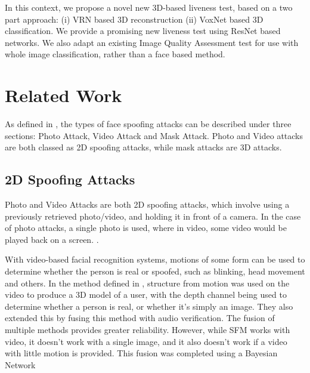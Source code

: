 \documentclass[11pt,a4paper]{article}
\begin{document}
    In this context, we propose a novel new 3D-based liveness test, based on a two part approach: (i) VRN based 3D reconstruction (ii) VoxNet based 3D classification.
    We provide a promising new liveness test using ResNet based networks. We also adapt an existing Image Quality Assessment test for use with whole image classification, rather
    than a face based method.

\section{Related Work}
    As defined in \cite{FaceSpoofingAttacksStudy}, the types of face spoofing attacks can be described under three sections: Photo Attack, Video Attack and Mask Attack.
    Photo and Video attacks are both classed as 2D spoofing attacks, while mask attacks are 3D attacks.

    \subsection{2D Spoofing Attacks}
        Photo and Video Attacks are both 2D spoofing attacks, which involve using a previously retrieved photo/video, and holding it in front of a camera. In the case of photo attacks,
        a single photo is used, where in video, some video would be played back on a screen. \cite{FaceSpoofingAttacksStudy}.

        With video-based facial recognition systems, motions of some form can be used to determine whether the person is real or spoofed, such as blinking, head movement and others.
        In the method defined in \cite{SFMClassifier}, structure from motion was used on the video to produce a 3D model of a user, with the depth channel being used to determine whether a person is real, or whether it's simply an image.
        They also extended this by fusing this method with audio verification. The fusion of multiple methods provides greater reliability. However, while SFM works with video, it doesn't work with a single image,
        and it also doesn't work if a video with little motion is provided. This fusion was completed using a Bayesian Network 
\end{document}
